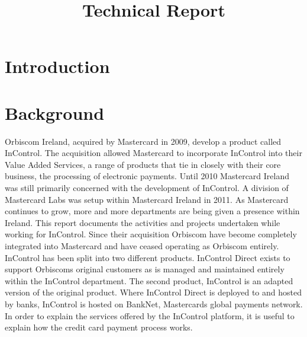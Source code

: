 \documentclass[a4paper,12pt, titlepage]{article}
\title{Technical Report}
\begin{document}
\maketitle

\tableofcontents


\section{Introduction}

\section{Background}
Orbiscom Ireland, acquired by Mastercard in 2009, develop a product called InControl. The acquisition allowed Mastercard to incorporate InControl into their Value Added Services, a range of products that tie in closely with their core business, the processing of electronic payments. Until 2010 Mastercard Ireland was still primarily concerned with the development of InControl. A division of Mastercard Labs was setup within Mastercard Ireland in 2011. As Mastercard continues to grow, more and more departments are being given a presence within Ireland. This report documents the activities and projects undertaken while working for InControl. Since their acquisition Orbiscom have become completely integrated into Mastercard and have ceased operating as Orbiscom entirely. InControl has been split into two different products. InControl Direct exists to support Orbiscoms original customers as is managed and maintained entirely within the InControl department. The second product, InControl is an adapted version of the original product. Where InControl Direct is deployed to and hosted by banks, InControl is hosted on BankNet, Mastercards global payments network. In order to explain the services offered by the InControl platform, it is useful to explain how the credit card payment process works.
\end{document}
